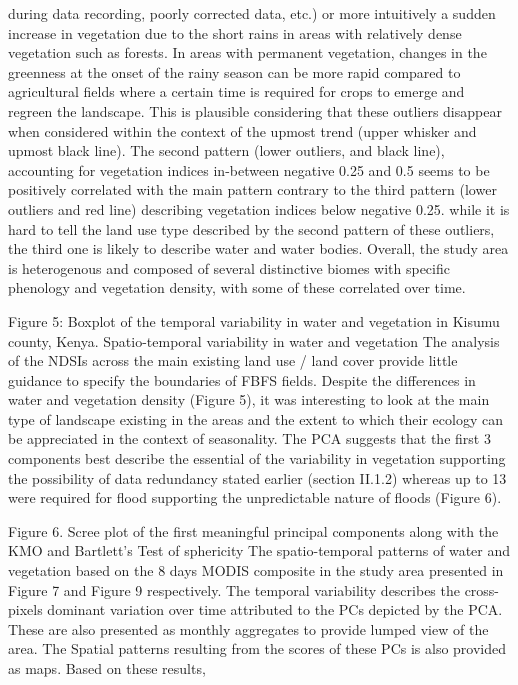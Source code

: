 \documentclass[12pt,oneside]{article}
\begin{document}
during data recording, poorly corrected data, etc.) or more intuitively
a sudden increase in vegetation due to the short rains in areas with
relatively dense vegetation such as forests. In areas with permanent
vegetation, changes in the greenness at the onset of the rainy season
can be more rapid compared to agricultural fields where a certain time
is required for crops to emerge and regreen the landscape. This is
plausible considering that these outliers disappear when considered
within the context of the upmost trend (upper whisker and upmost black
line). The second pattern (lower outliers, and black line), accounting
for vegetation indices in-between negative 0.25 and 0.5 seems to be
positively correlated with the main pattern contrary to the third
pattern (lower outliers and red line) describing vegetation indices
below negative 0.25. while it is hard to tell the land use type
described by the second pattern of these outliers, the third one is
likely to describe water and water bodies. Overall, the study area is
heterogenous and composed of several distinctive biomes with specific
phenology and vegetation density, with some of these correlated over
time.

Figure 5: Boxplot of the temporal variability in water and vegetation in
Kisumu county, Kenya. Spatio-temporal variability in water and
vegetation The analysis of the NDSIs across the main existing land use /
land cover provide little guidance to specify the boundaries of FBFS
fields. Despite the differences in water and vegetation density (Figure
5), it was interesting to look at the main type of landscape existing in
the areas and the extent to which their ecology can be appreciated in
the context of seasonality. The PCA suggests that the first 3 components
best describe the essential of the variability in vegetation supporting
the possibility of data redundancy stated earlier (section II.1.2)
whereas up to 13 were required for flood supporting the unpredictable
nature of floods (Figure 6).

Figure 6. Scree plot of the first meaningful principal components along
with the KMO and Bartlett's Test of sphericity The spatio-temporal
patterns of water and vegetation based on the 8 days MODIS composite in
the study area presented in Figure 7 and Figure 9 respectively. The
temporal variability describes the cross-pixels dominant variation over
time attributed to the PCs depicted by the PCA. These are also presented
as monthly aggregates to provide lumped view of the area. The Spatial
patterns resulting from the scores of these PCs is also provided as
maps. Based on these results,
\end{document}

